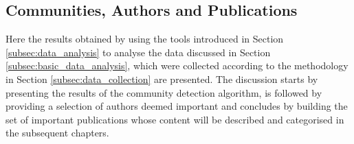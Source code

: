 \documentclass[11pt,a4paper]{book}
\theoremstyle{definition}
\theoremstyle{definition}
\theoremstyle{definition}
\theoremstyle{remark}
\newcommand{\pgraph}{\mathcal{G}_{p}}
\newcommand{\agraph}{\mathcal{G}_{a}}
\begin{document}
\subsection{Communities, Authors and Publications}
\label{subsec:communities_authors_publications}
Here the results obtained by using the tools introduced in Section \ref{subsec:data_analysis} to analyse the data discussed in Section \ref{subsec:basic_data_analysis}, which were collected according to the methodology in Section \ref{subsec:data_collection} are presented.
The discussion starts by presenting the results of the community detection algorithm, is followed by providing a selection of authors deemed important and concludes by building the set of important publications whose content will be described and categorised in the subsequent chapters.
%
\end{document}
